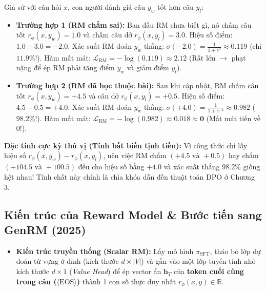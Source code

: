 \begin{mathdecode}
Giả sử với câu hỏi $x$, con người đánh giá câu $y_w$ tốt hơn câu $y_l$:
\begin{itemize}[leftmargin=1.2cm]
    \item \textbf{Trường hợp 1 (RM chấm sai):} Ban đầu RM chưa biết gì, nó chấm câu tốt $r_\phi(x, y_w) = 1.0$ và chấm câu dở $r_\phi(x, y_l) = 3.0$.
    Hiệu số điểm: $1.0 - 3.0 = -2.0$.
    Xác suất RM đoán $y_w$ thắng: $\sigma(-2.0) = \frac{1}{1 + e^{2}} \approx \mathbf{0.119}$ (chỉ $11.9\%$!).
    Hàm mất mát: $\mathcal{L}_{\text{RM}} = -\log(0.119) \approx \mathbf{2.12}$ (Rất lớn $\to$ phạt nặng để ép RM phải tăng điểm $y_w$ và giảm điểm $y_l$).
    \item \textbf{Trường hợp 2 (RM đã học thuộc bài):} Sau khi cập nhật, RM chấm câu tốt $r_\phi(x, y_w) = +4.5$ và câu dở $r_\phi(x, y_l) = +0.5$.
    Hiệu số điểm: $4.5 - 0.5 = +4.0$.
    Xác suất RM đoán $y_w$ thắng: $\sigma(+4.0) = \frac{1}{1 + e^{-4}} \approx \mathbf{0.982}$ ($98.2\%$!).
    Hàm mất mát: $\mathcal{L}_{\text{RM}} = -\log(0.982) \approx \mathbf{0.018 \approx 0}$ (Mất mát tiến về 0!).
\end{itemize}
\textbf{Đặc tính cực kỳ thú vị (Tính bất biến tịnh tiến):} Vì công thức chỉ lấy hiệu số $r_\phi(x, y_w) - r_\phi(x, y_l)$, nên việc RM chấm $(+4.5 \text{ và } +0.5)$ hay chấm $(+104.5 \text{ và } +100.5)$ đều cho hiệu số bằng $+4.0$ và xác suất thắng $98.2\%$ giống hệt nhau! Tính chất này chính là chìa khóa dẫn đến thuật toán DPO ở Chương 3.
\end{mathdecode}

\subsection{Kiến trúc của Reward Model \& Bước tiến sang GenRM (2025)}
\begin{itemize}[leftmargin=1.2cm]
    \item \textbf{Kiến trúc truyền thống (Scalar RM):} Lấy mô hình $\pi_{\text{SFT}}$, tháo bỏ lớp dự đoán từ vựng ở đỉnh (kích thước $d \times |V|$) và gắn vào một lớp tuyến tính nhỏ kích thước $d \times 1$ (\textit{Value Head}) để ép vector ẩn $\mathbf{h}_T$ của \textbf{token cuối cùng trong câu ($\langle\text{EOS}\rangle$)} thành 1 con số thực duy nhất $r_\phi(x, y) \in \mathbb{R}$.
\end{itemize}

